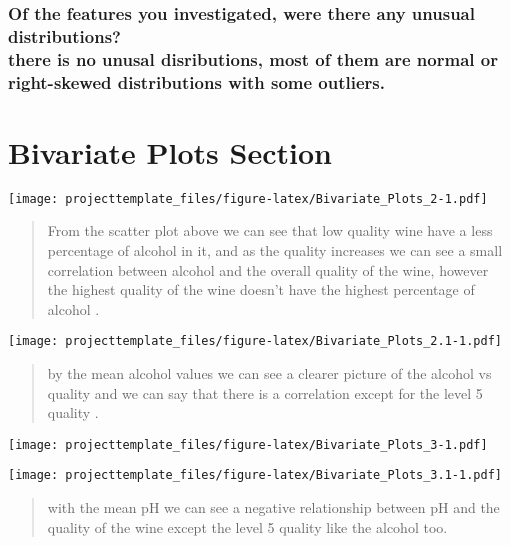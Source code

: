 \documentclass[]{article}
\begin{document}
\subsubsection{\texorpdfstring{Of the features you investigated, were
there any unusual distributions?\\
there is no unusal disributions, most of them are normal or right-skewed
distributions with some
outliers.}{Of the features you investigated, were there any unusual distributions? there is no unusal disributions, most of them are normal or right-skewed distributions with some outliers.}}\label{of-the-features-you-investigated-were-there-any-unusual-distributions-there-is-no-unusal-disributions-most-of-them-are-normal-or-right-skewed-distributions-with-some-outliers.}

\section{Bivariate Plots Section}\label{bivariate-plots-section}

\texttt{[image: projecttemplate\_files/figure-latex/Bivariate\_Plots\_2-1.pdf]}

\begin{quote}
From the scatter plot above we can see that low quality wine have a less
percentage of alcohol in it, and as the quality increases we can see a
small correlation between alcohol and the overall quality of the wine,
however the highest quality of the wine doesn't have the highest
percentage of alcohol .
\end{quote}

\texttt{[image: projecttemplate\_files/figure-latex/Bivariate\_Plots\_2.1-1.pdf]}

\begin{quote}
by the mean alcohol values we can see a clearer picture of the alcohol
vs quality and we can say that there is a correlation except for the
level 5 quality .
\end{quote}

\texttt{[image: projecttemplate\_files/figure-latex/Bivariate\_Plots\_3-1.pdf]}

\texttt{[image: projecttemplate\_files/figure-latex/Bivariate\_Plots\_3.1-1.pdf]}

\begin{quote}
with the mean pH we can see a negative relationship between pH and the
quality of the wine except the level 5 quality like the alcohol too.
\end{quote}
\end{document}
